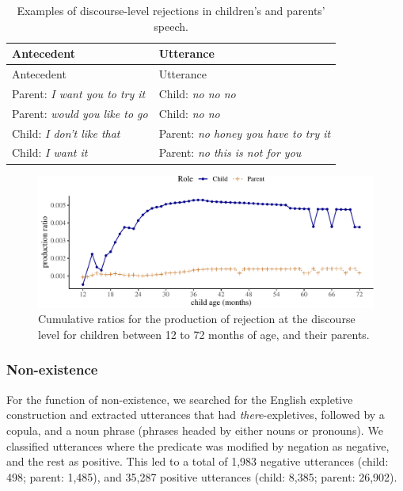 \documentclass[
  english,
  man,floatsintext]{apa6}
\begin{document}
\begin{longtable}[]{@{}ll@{}}
\caption{\label{tab:disreject} Examples of discourse-level rejections in children's and parents' speech.}\tabularnewline
\toprule
Antecedent & Utterance \\
\midrule
\endfirsthead
\toprule
Antecedent & Utterance \\
\midrule
\endhead
Parent: \emph{I want you to try it} & Child: \emph{no no no} \\
Parent: \emph{would you like to go} & Child: \emph{no no} \\
Child: \emph{I don't like that} & Parent: \emph{no honey you have to try it} \\
Child: \emph{I want it} & Parent: \emph{no this is not for you} \\
\bottomrule
\end{longtable}

\begin{figure}[H]

{\centering \includegraphics{neg_construction_article_files/figure-latex/emotiondiscourse-1} 

}

\caption{Cumulative ratios for the production of rejection at the discourse level for children between 12 to 72 months of age, and their parents.}\label{fig:emotiondiscourse}
\end{figure}

\hypertarget{non-existence}{%
\subsubsection{Non-existence}\label{non-existence}}

For the function of non-existence, we searched for the English expletive construction and extracted utterances that had \emph{there}-expletives, followed by a copula, and a noun phrase (phrases headed by either nouns or pronouns). We classified utterances where the predicate was modified by negation as negative, and the rest as positive. This led to a total of 1,983 negative utterances (child: 498; parent: 1,485), and 35,287 positive utterances (child: 8,385; parent: 26,902).
\end{document}
